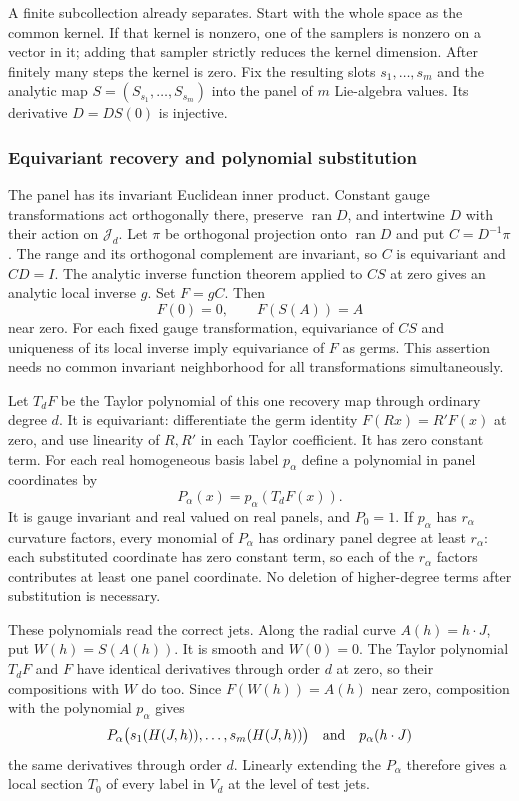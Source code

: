 A finite subcollection already separates. Start with the whole
space as the common kernel. If that kernel is nonzero, one of the
samplers is nonzero on a vector in it; adding that sampler strictly
reduces the kernel dimension. After finitely many steps the kernel
is zero. Fix the resulting slots $s_1,\ldots,s_m$ and the analytic
map $S=(S_{s_1},\ldots,S_{s_m})$ into the panel of $m$ Lie-algebra
values. Its derivative $D=DS(0)$ is injective.

\subsubsection{Equivariant recovery and polynomial substitution}
The panel has its invariant Euclidean inner product. Constant gauge
transformations act orthogonally there, preserve $\operatorname{ran}D$,
and intertwine $D$ with their action on $\mathcal J_d$.
Let $\pi$ be orthogonal projection onto $\operatorname{ran}D$ and
put $C=D^{-1}\pi$. The range and its orthogonal complement are
invariant, so $C$ is equivariant and $CD=I$.
The analytic inverse function theorem applied to $CS$ at zero gives
an analytic local inverse $g$. Set $F=gC$. Then
\[
                     F(0)=0,\qquad F(S(A))=A
\]
near zero. For each fixed gauge transformation, equivariance of
$CS$ and uniqueness of its local inverse imply equivariance of
$F$ as germs. This assertion needs no common invariant neighborhood
for all transformations simultaneously.

Let $T_dF$ be the Taylor polynomial of this one recovery map through
ordinary degree $d$. It is equivariant: differentiate the germ identity
$F(Rx)=R'F(x)$ at zero, and use linearity of $R,R'$ in each Taylor
coefficient. It has zero constant term. For each real homogeneous
basis label $p_\alpha$ define a polynomial in panel coordinates by
\[
                            P_\alpha(x)=p_\alpha(T_dF(x)).
\]
It is gauge invariant and real valued on real panels, and $P_0=1$.
If $p_\alpha$ has $r_\alpha$ curvature factors, every monomial of
$P_\alpha$ has ordinary panel degree at least $r_\alpha$:
each substituted coordinate has zero constant term, so each of the
$r_\alpha$ factors contributes at least one panel coordinate.
No deletion of higher-degree terms after substitution is necessary.

These polynomials read the correct jets. Along the radial curve
$A(h)=h\cdot J$, put $W(h)=S(A(h))$. It is smooth and $W(0)=0$.
The Taylor polynomial $T_dF$ and $F$ have identical derivatives
through order $d$ at zero, so their compositions with $W$ do too.
Since $F(W(h))=A(h)$ near zero, composition with the polynomial
$p_\alpha$ gives
\[
 P_\alpha\bigl(s_1(H(J,h)),\ldots,s_m(H(J,h))\bigr)
           \quad\hbox{and}\quad p_\alpha(h\cdot J)
\]
the same derivatives through order $d$.
Linearly extending the $P_\alpha$ therefore gives a local section
$T_0$ of every label in $V_d$ at the level of test jets.


